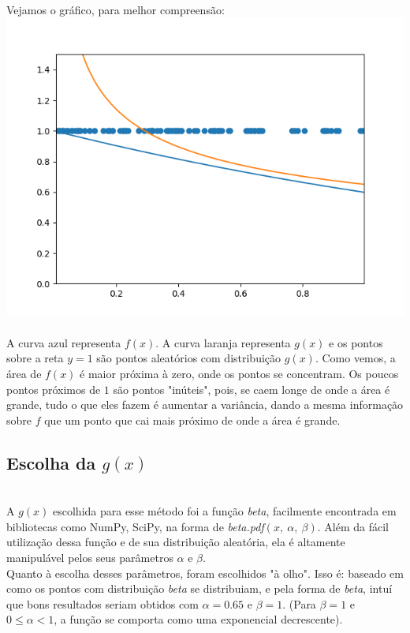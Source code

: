 \documentclass[pt12]{article}
\begin{document}
Vejamos o gráfico, para melhor compreensão:
\ \\

\includegraphics[scale=0.9]{graph.png}
\ \\

A curva azul representa $f(x)$. A curva laranja representa $g(x)$ e os pontos sobre a reta $y = 1$ são pontos aleatórios com distribuição $g(x)$. Como vemos, a área de $f(x)$ é maior próxima à zero, onde os pontos se concentram. Os poucos pontos próximos de $1$ são pontos "inúteis", pois, se caem longe de onde a área é grande, tudo o que eles fazem é aumentar a variância, dando a mesma informação sobre $f$ que um ponto que cai mais próximo de onde a área é grande.\\

\subsection{Escolha da $g(x)$}
\ \\

A $g(x)$ escolhida para esse método foi a função \textit{beta}, facilmente encontrada em bibliotecas como NumPy, SciPy, na forma de \textit{beta.pdf$(x,\ \alpha ,\ \beta)$}. Além da fácil utilização dessa função e de sua distribuição aleatória, ela é altamente manipulável pelos seus parâmetros $\alpha$ e $\beta$.\\
Quanto à escolha desses parâmetros, foram escolhidos "à olho". Isso é: baseado em como os pontos com distribuição \textit{beta} se distribuiam, e pela forma de \textit{beta}, intuí que bons resultados seriam obtidos com $\alpha = 0.65$ e $\beta = 1$. (Para $\beta=1$ e $0\leq \alpha <1$, a função se comporta como uma exponencial decrescente).\\
\end{document}
